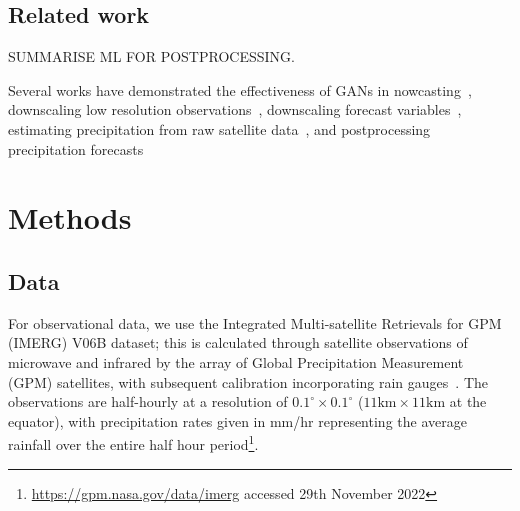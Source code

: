 \documentclass{article}
\begin{document}
\subsection{Related work}

SUMMARISE ML FOR POSTPROCESSING.

Several works have demonstrated the effectiveness of GANs in nowcasting~\citep{ravuri_skilful_2021}, downscaling low resolution observations~\citep{leinonen_stochastic_2020}, downscaling forecast variables~\citep{harris_generative_2022, price_increasing_2022}, estimating precipitation from raw satellite data~\citep{hayatbini_conditional_2019}, and postprocessing precipitation forecasts~\citep{duncan_generative_2022, jeong_correcting_2023,  hess_physically_2022, yang_improving_2023}


\section{Methods}
\subsection{Data}

\label{sec:data}


For observational data, we use the Integrated Multi-satellite Retrievals for GPM (IMERG) V06B dataset; this is calculated through satellite observations of microwave and infrared by the array of Global Precipitation Measurement (GPM) satellites, with subsequent calibration incorporating rain gauges~\citep{huffman_nasa_2018}. The observations are half-hourly at a resolution of $0.1^{\circ} \times 0.1^{\circ}$ ($11\text{km} \times 11\text{km}$ at the equator), with precipitation rates given in mm/hr representing the average rainfall over the entire half hour period\footnote{\href{https://gpm.nasa.gov/data/imerg}{https://gpm.nasa.gov/data/imerg} accessed 29th November 2022}.
\end{document}
